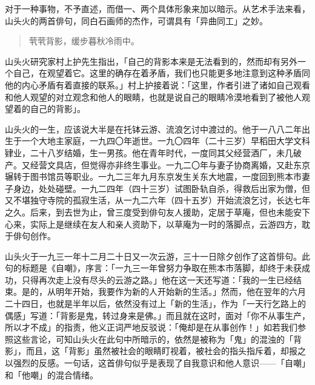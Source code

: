 {    对于一种事物，不予直述，而借一、两个具体形象来加以暗示。从艺术手法来看，山头火的两首俳句，同白石画师的杰作，可谓具有「异曲同工」之妙。

    \begin{quote}
        茕茕背影，缓步暮秋冷雨中。
    \end{quote}

    山头火研究家村上护先生指出，「自己的背影本来是无法看到的，然而却有另外一个自己，在观望着它。这里的确存在着矛盾，我们也只能更多地注意到这种矛盾同他的内心矛盾有着直接的联系。」村上护接着说：「这里，作者引进了诸如自己观看和他人观望的对立观念和他人的眼睛，也就是说自己的眼睛冷漠地看到了被他人观望着的自己的背影」\footnotemark[7]。


    山头火的一生，应该说大半是在托钵云游、流浪乞讨中渡过的。他于一八八二年出生于一个大地主家庭，一九四〇年逝世。一九〇四年（二十三岁）早稻田大学文科肄业，二十八岁结婚，生一男孩。他在青年时代，一度同其父经营酒厂，未几破产。又经营文具店，但觉得亦非终生事业。一九二〇年与妻子协商离婚，又赴东京辗转于图书馆员等职业。一九二三年九月东京发生关东大地震，一度回到熊本市妻子身边，处处碰壁。一九二四年（四十三岁）试图卧轨自杀，得救后出家为僧，但又不堪独守寺院的孤寂生活，从一九二六年（四十五岁）开始流浪乞讨，长达七年之久。后来，到去世为止，曾三度受到俳句友人援助，定居于草庵，但也未能安下心来，实际上是继续在友人和亲人资助下，以草庵为一时的落脚点，云游四方，耽于俳句创作。

    山头火于一九三一年十二月二十日又一次云游，三十一日除夕创作了这首悱句。此句的标题是《自嘲》，序言：「一九三一年曾努力争取在熊本市落脚，却终于未获成功，只得再次走上没有尽头的云游之路。」他在这一天还写道：「我的一生已经结束。是的，从明年开始，我要作为新的人开始新的生活。」\footnotemark[8]然而，他在翌年的六月二十四日，也就是半年以后，依然没有过上「新的生活」，作为「一天行乞路上的偶感」写道：「背影是鬼，转过身来是佛。」\footnotemark[9]而且就在这时，面对「你不从事生产，所以才不成」的指责，他义正词严地反驳说：「俺却是在从事创作！」如若我们参照这些言论，可知山头火在此句中所暗示的，依然是被称为「鬼」的混浊的「背影」，而且，这「背影」虽然被社会的眼睛盯视着，被社会的指头指斥着，却报之以强烈的反感。一句话，这首俳句似乎是表现了自我意识和他人意识——「自嘲」和「他嘲」的混合情绪。


}
